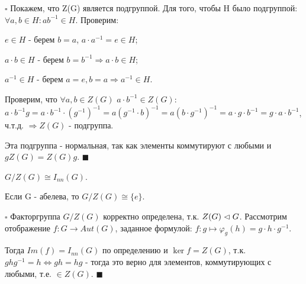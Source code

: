 \documentclass[../main.tex]{subfiles}
\begin{document}
\void
$\square$ Покажем, что Z(G) является подгруппой. Для того, чтобы H было подгруппой:
$\forall a,b\in H: ab^{-1}\in H$. Проверим:

\void{} $e\in H$ - берем $b = a$, $a\cdot a^{-1} = e\in H$;

 $a\cdot b\in H$ - берем $b = b^{-1} \Longrightarrow a\cdot b\in H$;

 $a^{-1}\in H$ - берем $a = e, b = a \Longrightarrow a^{-1}\in H$.

Проверим, что $\forall a, b\in Z(G)$ $a\cdot b^{-1}\in Z(G)$: $a\cdot b^{-1}g = a\cdot b^{-1}\cdot(g^{-1})^{-1} =
a(g^{-1}\cdot b)^{-1} = a(b\cdot g^{-1})^{-1} = a\cdot g\cdot b^{-1} = g\cdot a\cdot b^{-1}$, ч.т.д.
$\Longrightarrow Z(G)$ - подгруппа.

Эта подгруппа - нормальная, так как элементы коммутируют с любыми и $gZ(G) = Z(G)g$. $\blacksquare$

\void{} $G/Z(G) \cong I_{nn}(G)$.

\void{} Если G - абелева, то $G/Z(G) \cong \{e\}$.

\void
$\square$ Факторгруппа $G/Z(G)$ корректно определена, т.к. $Z(G)\vartriangleleft G$.
Рассмотрим отображение $f: G\rightarrow Aut(G)$, заданное формулой:
$f: g\mapsto \varphi_g(h) = g\cdot h\cdot g^{-1}$.

Тогда $Im(f) = I_{nn}(G)$ по определению и $\ker{f} = Z(G)$, т.к. $ghg^{-1} = h \Longleftrightarrow
gh = hg$ - тогда это верно для элементов, коммутирующих с любыми, т.е. $\in Z(G)$. $\blacksquare$
\end{document}
